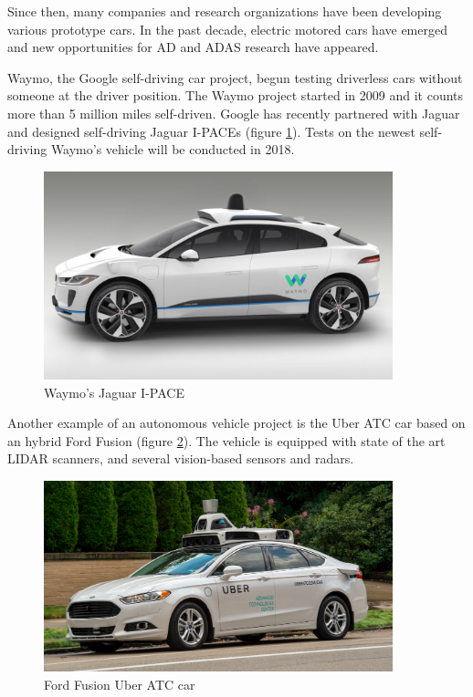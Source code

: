 Since then, many companies and research organizations have been developing various prototype cars. In the past decade, electric motored cars have emerged and new opportunities for AD and ADAS research have appeared. 

Waymo, the Google self-driving car project, begun testing driverless cars without someone at the driver position. The Waymo project started in 2009 and it counts more than 5 million miles self-driven. Google has recently partnered with Jaguar and designed self-driving Jaguar I-PACEs (figure \ref{fig:waymo}). Tests on the newest self-driving Waymo's vehicle will be conducted in 2018. \cite{Waymo}


\begin{figure}[htp]
	
	\centering
	\includegraphics[width=0.9\textwidth]{capstate/imgs/waymo}
	
	\caption{Waymo's Jaguar I-PACE}
	\label{fig:waymo}
	
\end{figure}

Another example of an autonomous vehicle project is the Uber ATC car based on an hybrid Ford Fusion (figure \ref{fig:uber}). The vehicle is equipped with state of the art LIDAR scanners, and several vision-based sensors and radars.

\begin{figure}[htp]
	
	\centering
	\includegraphics[width=0.9\textwidth]{capstate/imgs/uber}
	
	\caption{Ford Fusion Uber ATC car}
	\label{fig:uber}
	
\end{figure}

